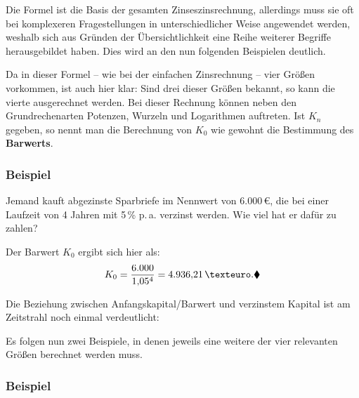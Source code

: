 Die Formel ist die Basis der gesamten Zinseszinsrechnung, allerdings muss sie oft bei komplexeren Fragestellungen in unterschiedlicher Weise angewendet werden, weshalb sich aus Gründen der Übersichtlichkeit eine Reihe weiterer Begriffe herausgebildet haben. Dies wird an den nun folgenden Beispielen deutlich.

Da in dieser Formel -- wie bei der einfachen Zinsrechnung -- vier Größen vorkommen, ist auch hier klar: Sind drei dieser Größen bekannt, so kann die vierte ausgerechnet werden. Bei dieser Rechnung können neben den Grundrechenarten Potenzen, Wurzeln und Logarithmen auftreten. Ist $K_n$ gegeben, so nennt man die Berechnung von $K_0$ wie gewohnt die Bestimmung des \textbf{Barwerts}.

\subsubsection{Beispiel}

Jemand kauft abgezinste Sparbriefe im Nennwert von 6.000\,€, die bei einer Laufzeit von 4 Jahren mit 5\,\% p.\,a. verzinst werden. Wie viel hat er dafür zu zahlen?

Der Barwert $K_0$ ergibt sich hier als:
\[ K_0 = \frac{6.000}{1{,}05^4} = 4.936{,}21\,€ .\beispielende \]

Die Beziehung zwischen Anfangskapital/Barwert und verzinstem Kapital ist am Zeitstrahl noch einmal verdeutlicht:

\begin{center}
\end{center}

Es folgen nun zwei Beispiele, in denen jeweils eine weitere der vier relevanten Größen berechnet werden muss.

\subsubsection{Beispiel}

